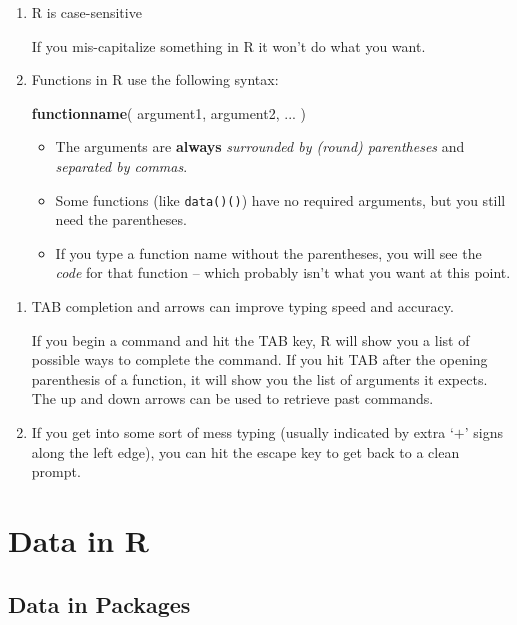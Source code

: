 \documentclass[]{book}
\newenvironment{Shaded}{\begin{snugshade}}{\end{snugshade}}
\newcommand{\KeywordTok}[1]{\textcolor[rgb]{0.13,0.29,0.53}{\textbf{#1}}}
\newcommand{\NormalTok}[1]{#1}
\begin{document}
\begin{enumerate}
\def\labelenumi{(\arabic{enumi})}
\item
  R is case-sensitive

  If you mis-capitalize something in R it won't do what you want.
\item
  Functions in R use the following syntax:

\begin{Shaded}
\begin{Highlighting}[]
  \KeywordTok{functionname}\NormalTok{( argument1, argument2, ... )}
\end{Highlighting}
\end{Shaded}

  \begin{itemize}
  \item
    The arguments are \textbf{always} \emph{surrounded by (round) parentheses} and \emph{separated by commas}.
  \item
    Some functions (like \texttt{data()()}) have no required arguments, but you still need the parentheses.
  \item
    If you type a function name without the parentheses, you will see the \emph{code} for that function -- which probably isn't what you want at this point.
  \end{itemize}
\end{enumerate}

\begin{enumerate}
\def\labelenumi{(\arabic{enumi})}
\setcounter{enumi}{2}
\item
  TAB completion and arrows can improve typing speed and accuracy.

  If you begin a command and hit the TAB key, R will show you a list of possible ways to complete the command. If you hit TAB after the opening parenthesis of a function, it will show you the list of arguments it expects. The up and down arrows can be used to retrieve past commands.
\item
  If you get into some sort of mess typing (usually indicated by extra `\(+\)'
  signs along the left edge), you can hit the escape key to get back to
  a clean prompt.
\end{enumerate}

\hypertarget{data-in-r}{%
\section{Data in R}\label{data-in-r}}

\hypertarget{data-in-packages}{%
\subsection{Data in Packages}\label{data-in-packages}}
\end{document}
